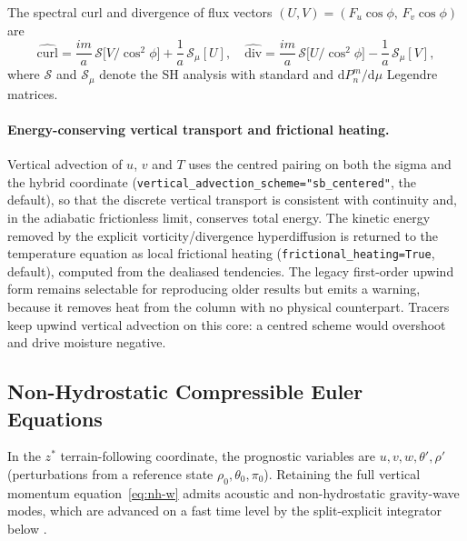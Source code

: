 \documentclass[11pt,a4paper]{article}
\newcommand{\dd}{\mathrm{d}}
\begin{document}
The spectral curl and divergence of flux vectors $(U,V)=(F_u\cos\phi,\,F_v\cos\phi)$ are
\begin{equation}
  \widehat{\text{curl}} = \frac{im}{a}\,\mathcal S\bigl[V/\cos^2\!\phi\bigr] + \frac{1}{a}\,\mathcal S_\mu[U],
  \quad
  \widehat{\text{div}} = \frac{im}{a}\,\mathcal S\bigl[U/\cos^2\!\phi\bigr] - \frac{1}{a}\,\mathcal S_\mu[V],
\end{equation}
where $\mathcal S$ and $\mathcal S_\mu$ denote the SH analysis with standard and $\dd P_n^m/\dd\mu$ Legendre matrices.

\paragraph{Energy-conserving vertical transport and frictional heating.}
Vertical advection of $u$, $v$ and $T$ uses the centred \citet{SimmonsBurridge1981} pairing on both the sigma and the hybrid coordinate (\texttt{vertical\_advection\_scheme="sb\_centered"}, the default), so that the discrete vertical transport is consistent with continuity and, in the adiabatic frictionless limit, conserves total energy.  The kinetic energy removed by the explicit vorticity/divergence hyperdiffusion is returned to the temperature equation as local frictional heating (\texttt{frictional\_heating=True}, default), computed from the dealiased tendencies.  The legacy first-order upwind form remains selectable for reproducing older results but emits a warning, because it removes heat from the column with no physical counterpart.  Tracers keep upwind vertical advection on this core: a centred scheme would overshoot and drive moisture negative.

\subsection{Non-Hydrostatic Compressible Euler Equations}

In the $z^*$ terrain-following coordinate, the prognostic variables are $u,v,w,\theta',\rho'$ (perturbations from a reference state $\rho_0,\theta_0,\pi_0$).  Retaining the full vertical momentum equation~\eqref{eq:nh-w} admits acoustic and non-hydrostatic gravity-wave modes, which are advanced on a fast time level by the split-explicit integrator below \citep{SkamarockKlemp2008}.
\end{document}
